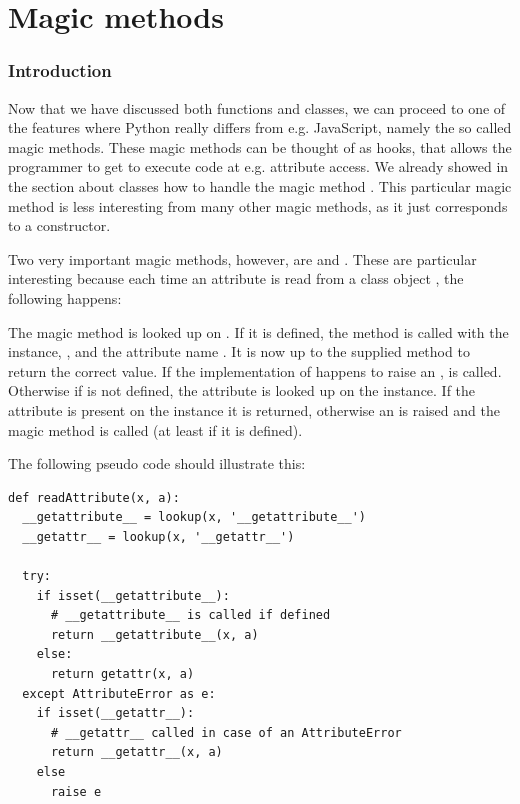 \chapter{Magic methods}
\subsection{Introduction}
Now that we have discussed both functions and classes, we can proceed to one of the features where Python really differs from e.g. JavaScript, namely the so called magic methods. These magic methods can be thought of as hooks, that allows the programmer to get to execute code at e.g. attribute access. We already showed in the section about classes how to handle the magic method . This particular magic method is less interesting from many other magic methods, as it just corresponds to a constructor.

Two very important magic methods, however, are  and . These are particular interesting because each time an attribute  is read from a class object , the following happens:

The magic method  is looked up on . If it is defined, the method is called with the instance, , and the attribute name . It is now up to the supplied method to return the correct value. If the implementation of  happens to raise an ,  is called. Otherwise if  is not defined, the attribute is looked up on the instance. If the attribute is present on the instance it is returned, otherwise an  is raised and the magic method  is called (at least if it is defined).

The following pseudo code should illustrate this:

\begin{listing}[H]
	\begin{verbatim}
def readAttribute(x, a):
  __getattribute__ = lookup(x, '__getattribute__')
  __getattr__ = lookup(x, '__getattr__')

  try:
    if isset(__getattribute__):
      # __getattribute__ is called if defined
      return __getattribute__(x, a)
    else:
      return getattr(x, a)
  except AttributeError as e:
    if isset(__getattr__):
      # __getattr__ called in case of an AttributeError
      return __getattr__(x, a)
    else
      raise e
	\end{verbatim}
\end{listing}

